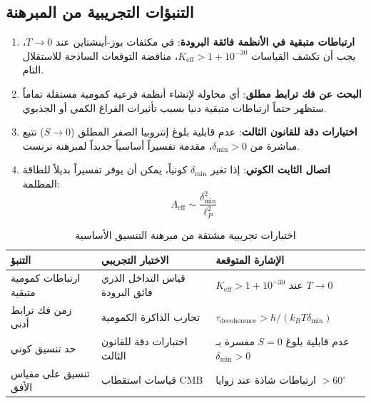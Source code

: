 \documentclass[11pt,a4paper]{article}
\begin{document}
	\subsection{التنبؤات التجريبية من المبرهنة}
	
	\begin{enumerate}
		\item \textbf{ارتباطات متبقية في الأنظمة فائقة البرودة}: في مكثفات بوز-أينشتاين عند $T \to 0$، يجب أن تكشف القياسات $K_{\mathrm{eff}} > 1 + 10^{-30}$، مناقضة التوقعات الساذجة للاستقلال التام.
		
		\item \textbf{البحث عن فك ترابط مطلق}: أي محاولة لإنشاء أنظمة فرعية كمومية مستقلة تماماً ستظهر حتماً ارتباطات متبقية دنيا بسبب تأثيرات الفراغ الكمي أو الجذبوي.
		
		\item \textbf{اختبارات دقة للقانون الثالث}: عدم قابلية بلوغ إنتروبيا الصفر المطلق ($S \to 0$) تتبع مباشرة من $\delta_{\min} > 0$، مقدمة تفسيراً أساسياً جديداً لمبرهنة نرنست.
		
		\item \textbf{اتصال الثابت الكوني}: إذا تغير $\delta_{\min}$ كونياً، يمكن أن يوفر تفسيراً بديلاً للطاقة المظلمة:
		\begin{equation}
			\Lambda_{\mathrm{eff}} \sim \frac{\delta_{\min}^2}{\ell_P^2}
		\end{equation}
	\end{enumerate}
	
	\begin{table}[htbp]
		\centering
		\small
		\begin{english}
			\begin{tabular}{p{}p{}p{}}
				\toprule
				\textbf{التنبؤ} & \textbf{الاختبار التجريبي} & \textbf{الإشارة المتوقعة} \\
				\midrule
				ارتباطات كمومية متبقية & قياس التداخل الذري فائق البرودة & $K_{\mathrm{eff}} > 1 + 10^{-30}$ عند $T \to 0$ \\
				زمن فك ترابط أدنى & تجارب الذاكرة الكمومية & $\tau_{\text{decoherence}} > \hbar/(k_B T \delta_{\min})$ \\
				حد تنسيق كوني & اختبارات دقة للقانون الثالث & عدم قابلية بلوغ $S=0$ مفسرة بـ $\delta_{\min}>0$ \\
				تنسيق على مقياس الأفق & قياسات استقطاب CMB & ارتباطات شاذة عند زوايا $>60^\circ$ \\
				\bottomrule
			\end{tabular}
		\end{english}
		\caption{اختبارات تجريبية مشتقة من مبرهنة التنسيق الأساسية}
		\label{tab:theorem-predictions}
	\end{table}
	
\end{document}
